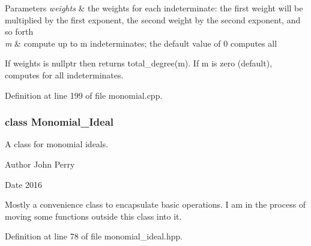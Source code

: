 \begin{DoxyParams}{Parameters}
{\em weights} & the weights for each indeterminate\+: the first weight will be multiplied by the first exponent, the second weight by the second exponent, and so forth \\
\hline
{\em m} & compute up to {\ttfamily m} indeterminates; the default value of 0 computes all\\
\hline
\end{DoxyParams}
If {\ttfamily weights} is {\ttfamily nullptr} then returns total\+\_\+degree(m). If {\ttfamily m} is zero (default), computes for all indeterminates. 

Definition at line 199 of file monomial.\+cpp.

\label{class_monomial___ideal}
\subsubsection{class Monomial\+\_\+\+Ideal}
A class for monomial ideals. 

\begin{DoxyAuthor}{Author}
John Perry 
\end{DoxyAuthor}
\begin{DoxyDate}{Date}
2016
\end{DoxyDate}
Mostly a convenience class to encapsulate basic operations. I am in the process of moving some functions outside this class into it. 

Definition at line 78 of file monomial\+\_\+ideal.\+hpp.

